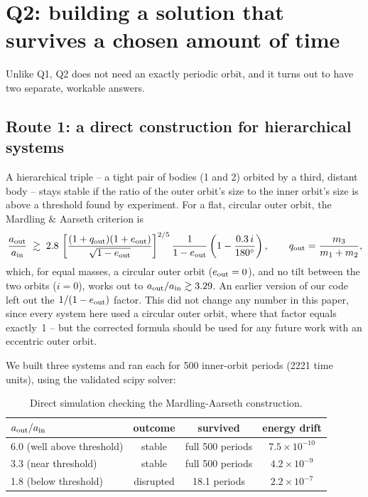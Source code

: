 \documentclass[11pt]{article}
\begin{document}
\section{Q2: building a solution that survives a chosen amount of time}
\label{sec:q2}

Unlike Q1, Q2 does not need an exactly periodic orbit, and it turns out to
have two separate, workable answers.

\subsection{Route 1: a direct construction for hierarchical systems}
\label{sec:q2-hierarchical}

A hierarchical triple -- a tight pair of bodies (1 and 2) orbited by a
third, distant body -- stays stable if the ratio of the outer orbit's size
to the inner orbit's size is above a threshold found by experiment. For a
flat, circular outer orbit, the Mardling \& Aarseth criterion
\cite{MardlingAarseth2001} is
\begin{equation}
  \frac{a_{\rm out}}{a_{\rm in}} \;\gtrsim\; 2.8\,
  \left[\frac{(1+q_{\rm out})(1+e_{\rm out})}{\sqrt{1-e_{\rm out}}}\right]^{2/5}
  \frac{1}{1-e_{\rm out}}
  \left(1 - \frac{0.3\,i}{180^\circ}\right),
  \qquad q_{\rm out} = \frac{m_3}{m_1+m_2},
  \label{eq:mardling}
\end{equation}
which, for equal masses, a circular outer orbit ($e_{\rm out}=0$), and no
tilt between the two orbits ($i=0$), works out to
$a_{\rm out}/a_{\rm in} \gtrsim 3.29$. An earlier version of our code left
out the $1/(1-e_{\rm out})$ factor. This did not change any number in this
paper, since every system here used a circular outer orbit, where that
factor equals exactly~1 -- but the corrected formula should be used for
any future work with an eccentric outer orbit.

We built three systems and ran each for 500 inner-orbit periods (2221
time units), using the validated scipy solver:

\begin{table}[htbp]
  \centering
  \begin{tabular}{lccc}
    \toprule
    $a_{\rm out}/a_{\rm in}$ & outcome & survived & energy drift \\
    \midrule
    6.0 (well above threshold) & stable & full 500 periods & $7.5\times10^{-10}$ \\
    3.3 (near threshold) & stable & full 500 periods & $4.2\times10^{-9}$ \\
    1.8 (below threshold) & disrupted & 18.1 periods & $2.2\times10^{-7}$ \\
    \bottomrule
  \end{tabular}
  \caption{Direct simulation checking the Mardling-Aarseth construction.}
  \label{tab:hierarchical}
\end{table}
\end{document}
